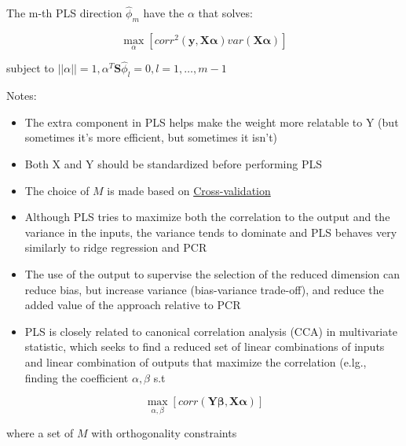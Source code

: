 \documentclass[
]{book}
\begin{document}
The m-th PLS direction \(\hat{\phi}_m\) have the \(\alpha\) that solves:

\[
\max_\alpha  [corr^2(\mathbf{y}, \mathbf{X \alpha}) var(\mathbf{X \alpha})]
\]

subject to \(||\alpha|| =1, \alpha^T \mathbf{S}\hat{\phi}_l =0,l = 1, \dots, m-1\)

Notes:

\begin{itemize}
\item
  The extra component in PLS helps make the weight more relatable to Y (but sometimes it's more efficient, but sometimes it isn't)
\item
  Both X and Y should be standardized before performing PLS
\item
  The choice of \(M\) is made based on \protect\hyperlink{cross-validation}{Cross-validation}
\item
  Although PLS tries to maximize both the correlation to the output and the variance in the inputs, the variance tends to dominate and PLS behaves very similarly to ridge regression and PCR
\item
  The use of the output to supervise the selection of the reduced dimension can reduce bias, but increase variance (bias-variance trade-off), and reduce the added value of the approach relative to PCR
\item
  PLS is closely related to canonical correlation analysis (CCA) in multivariate statistic, which seeks to find a reduced set of linear combinations of inputs and linear combination of outputs that maximize the correlation (e.lg., finding the coefficient \(\alpha, \beta\) s.t
\end{itemize}

\[
\max_{\alpha, \beta} [corr(\mathbf{Y \beta}, \mathbf{X \alpha})]
\]

where a set of \(M\) with orthogonality constraints
\end{document}
